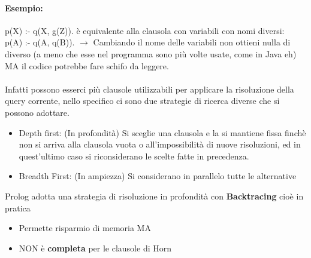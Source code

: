 \documentclass[12pt, a4paper, openany, oneside]{book}
\begin{document}
\paragraph{Esempio: } 
p(X) :- q(X, g(Z)).
è equivalente alla clausola con variabili con nomi diversi: \\
p(A) :- q(A, q(B)). $\to$ Cambiando il nome delle variabili non ottieni nulla
di diverso (a meno che esse nel programma sono più volte usate, come in Java eh)
MA il codice potrebbe fare schifo da leggere.
\\ \\
Infatti possono esserci più clausole utilizzabili per applicare la risoluzione
della query corrente, nello specifico ci sono due strategie di ricerca diverse
che si possono adottare.
\begin{itemize}
	\item Depth first: (In profondità) Si sceglie una clausola e la si mantiene fissa 
	finchè non si arriva alla clausola vuota o all'impossibilità di nuove risoluzioni,
	ed in quest'ultimo caso si riconsiderano le scelte fatte in precedenza.
	\item Breadth First: (In ampiezza) Si considerano in parallelo tutte le alternative
\end{itemize}
Prolog adotta una strategia di risoluzione in profondità con \textbf{Backtracing}
cioè in pratica 
\begin{itemize}
	\item Permette risparmio di memoria MA
	\item NON è \textbf{completa} per le clausole di Horn
\end{itemize}
\end{document}
